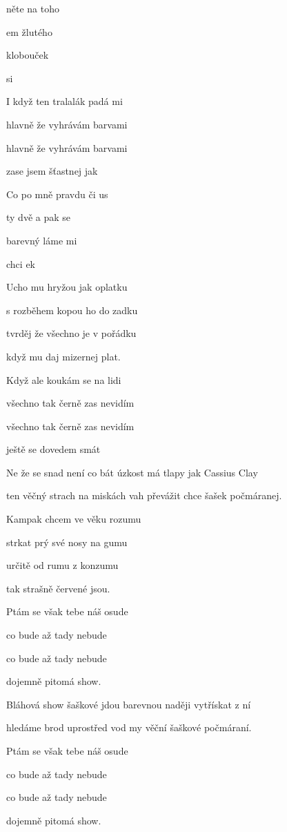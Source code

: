 

\zs
{}něte na toho 

em žlutého 

 klobouček 

 si   
\ks

\zs
I když ten tralalák padá mi

hlavně že vyhrávám barvami

hlavně že vyhrávám barvami

zase jsem šťastnej jak   
\ks

\zr
Co po mně  pravdu či us

ty dvě  a pak se 

barevný  láme mi 

 chci ek 
\kr

\zs
Ucho mu hryžou jak oplatku

s rozběhem kopou ho do zadku

tvrděj že všechno je v pořádku

když mu daj mizernej plat.
\ks

\zs
Když ale koukám se na lidi

všechno tak černě zas nevidím

všechno tak černě zas nevidím

ještě se dovedem smát
\ks

\zr
Ne že se snad není co bát úzkost má tlapy jak Cassius Clay

ten věčný strach na miskách vah převážit chce šašek počmáranej.
\kr

\zs
Kampak chcem ve věku rozumu

strkat prý své nosy na gumu

určitě od rumu z konzumu

tak strašně červené jsou.
\ks

\zs
Ptám se však tebe náš osude

co bude až tady nebude

co bude až tady nebude

dojemně pitomá show.
\ks

\zr
Bláhová show šaškové jdou barevnou naději vytřískat z ní

hledáme brod uprostřed vod my věční šaškové počmáraní.
\kr

\zs
Ptám se však tebe náš osude

co bude až tady nebude

co bude až tady nebude

dojemně pitomá show.
\ks
\kp






















